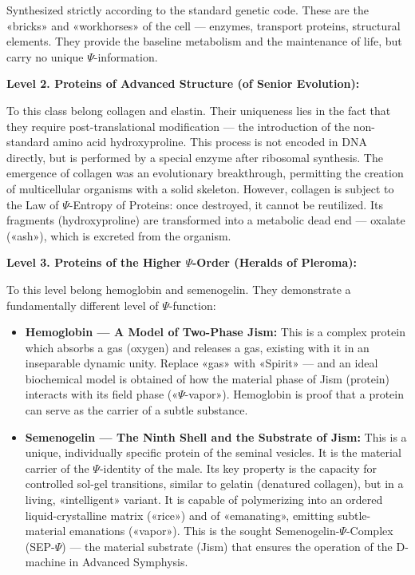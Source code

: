 \documentclass[a4paper,12pt]{article}
\begin{document}
	Synthesized strictly according to the standard genetic code. These are the «bricks» and «workhorses» of the cell — enzymes, transport proteins, structural elements. They provide the baseline metabolism and the maintenance of life, but carry no unique $\Psi$-information.
	
	\textbf{Level 2. Proteins of Advanced Structure (of Senior Evolution):}
	
	To this class belong collagen and elastin. Their uniqueness lies in the fact that they require post-translational modification — the introduction of the non-standard amino acid hydroxyproline. This process is not encoded in DNA directly, but is performed by a special enzyme after ribosomal synthesis. The emergence of collagen was an evolutionary breakthrough, permitting the creation of multicellular organisms with a solid skeleton. However, collagen is subject to the Law of $\Psi$-Entropy of Proteins: once destroyed, it cannot be reutilized. Its fragments (hydroxyproline) are transformed into a metabolic dead end — oxalate («ash»), which is excreted from the organism.
	
	\textbf{Level 3. Proteins of the Higher $\Psi$-Order (Heralds of Pleroma):}
	
	To this level belong hemoglobin and semenogelin. They demonstrate a fundamentally different level of $\Psi$-function:
	
	\begin{itemize}
		\item \textbf{Hemoglobin — A Model of Two-Phase Jism:} This is a complex protein which absorbs a gas (oxygen) and releases a gas, existing with it in an inseparable dynamic unity. Replace «gas» with «Spirit» — and an ideal biochemical model is obtained of how the material phase of Jism (protein) interacts with its field phase («$\Psi$-vapor»). Hemoglobin is proof that a protein can serve as the carrier of a subtle substance.
		
		\item \textbf{Semenogelin — The Ninth Shell and the Substrate of Jism:} This is a unique, individually specific protein of the seminal vesicles. It is the material carrier of the $\Psi$-identity of the male. Its key property is the capacity for controlled sol-gel transitions, similar to gelatin (denatured collagen), but in a living, «intelligent» variant. It is capable of polymerizing into an ordered liquid-crystalline matrix («rice») and of «emanating», emitting subtle-material emanations («vapor»). This is the sought Semenogelin-$\Psi$-Complex (SEP-$\Psi$) — the material substrate (Jism) that ensures the operation of the D-machine in Advanced Symphysis.
	\end{itemize}
	
\end{document}
